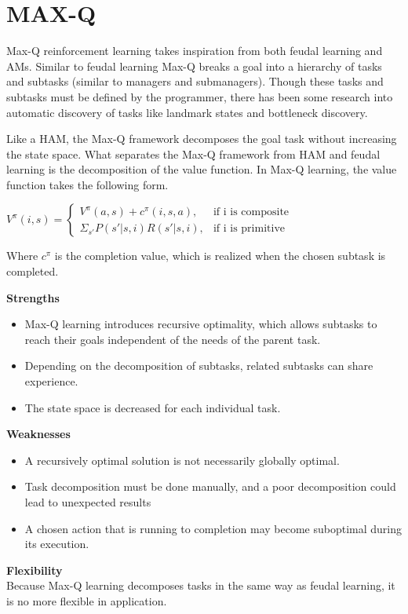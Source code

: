 \section{MAX-Q}
Max-Q reinforcement learning takes inspiration from both feudal learning and
AMs. Similar to feudal learning Max-Q breaks a goal into a hierarchy of tasks
and subtasks (similar to managers and submanagers). Though these tasks and
subtasks must be defined by the programmer, there has been some research into
automatic discovery of tasks like landmark states and bottleneck discovery.

Like a HAM, the Max-Q framework decomposes the goal task without increasing
the state space. What separates the Max-Q framework from HAM and feudal
learning is the decomposition of the value function. In Max-Q learning, the
value function takes the following form.

\begin{math}
V^{\pi}(i, s) =
\begin{cases}
V^{\pi}(a, s) + c^{\pi}(i, s, a), & \text{if i is composite}\\
\Sigma_{s'}P(s'|s, i)R(s'|s, i), & \text{if i is primitive}
\end{cases}
\end{math}

Where $c^{\pi}$ is the completion value, which is realized when the chosen
subtask is completed. \cite{Dietterich}

\textbf{Strengths}
\begin{itemize}
    \item Max-Q learning introduces recursive optimality, which allows subtasks	to reach their goals independent of the needs of the parent task.
    \item Depending on the decomposition of subtasks, related subtasks can share experience.
    \item The state space is decreased for each individual task.
\end{itemize}

\textbf{Weaknesses}
\begin{itemize}
    \item A recursively optimal solution is not necessarily globally optimal.
    \item Task decomposition must be done manually, and a poor decomposition could lead to unexpected results
    \item A chosen action that is running to completion may become suboptimal during its execution.
\end{itemize}

\textbf{Flexibility} \\
Because Max-Q learning decomposes tasks in the same way as feudal learning, it is no more flexible in application.

